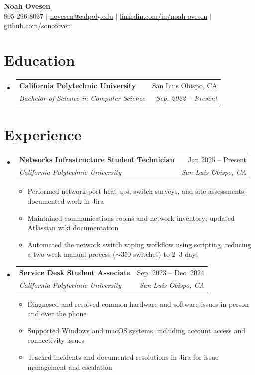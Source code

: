 \documentclass[letterpaper,11pt]{article}
\makeatletter
\newcommand{\resumeItem}[1]{
  \item\small{
    {#1 \vspace{-2pt}}
  }
}
\newcommand{\resumeSubheading}[4]{
  \vspace{-2pt}\item
    \begin{tabular*}{0.97\textwidth}[t]{l@{\extracolsep{\fill}}r}
      \textbf{#1} & #2 \\
      \textit{\small#3} & \textit{\small #4} \\
    \end{tabular*}\vspace{-7pt}
}
\newcommand{\resumeSubHeadingListStart}{\begin{itemize}[leftmargin=0.15in, label={}]}
\newcommand{\resumeSubHeadingListEnd}{\end{itemize}}
\newcommand{\resumeItemListStart}{\begin{itemize}}
\newcommand{\resumeItemListEnd}{\end{itemize}\vspace{-5pt}}
\makeatother
\begin{document}

\begin{center}
    \textbf{\Huge \bfseries Noah Ovesen} \\ \vspace{1pt}
    \small 805-296-8037 $|$ \href{mailto:novesen@calpoly.edu}{\underline{novesen@calpoly.edu}} $|$ 
    \href{https://www.linkedin.com/in/noah-ovesen-618978281/}{\underline{linkedin.com/in/noah-ovesen}} $|$
    \href{https://github.com/sonofoven}{\underline{github.com/sonofoven}}
\end{center}


\section{Education}
  \resumeSubHeadingListStart
    \resumeSubheading
      {California Polytechnic University}{San Luis Obispo, CA}
      {Bachelor of Science in Computer Science}{Sep. 2022 -- Present}
  \resumeSubHeadingListEnd


\section{Experience}
  \resumeSubHeadingListStart

    \resumeSubheading
      {Networks Infrastructure Student Technician}{Jan 2025 -- Present}
      {California Polytechnic University}{San Luis Obispo, CA}
      \resumeItemListStart

        \resumeItem{Performed network port heat-ups, switch surveys, and site assessments; documented work in Jira}
        \resumeItem{Maintained communications rooms and network inventory; updated Atlassian wiki documentation}
        \resumeItem{Automated the network switch wiping workflow using scripting, reducing a two-week manual process ($\sim$350 switches) to 2--3 days}
      \resumeItemListEnd
      
    \resumeSubheading
      {Service Desk Student Associate}{Sep. 2023 -- Dec. 2024}
      {California Polytechnic University}{San Luis Obispo, CA}
      \resumeItemListStart
        \resumeItem{Diagnosed and resolved common hardware and software issues in person and over the phone}
        \resumeItem{Supported Windows and macOS systems, including account access and connectivity issues}
        \resumeItem{Tracked incidents and documented resolutions in Jira for issue management and escalation}
      \resumeItemListEnd
  \resumeSubHeadingListEnd
\end{document}

